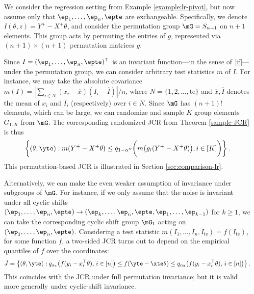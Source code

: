 \documentclass[english]{article}
\begin{document}
\begin{example}\label{lr}
We consider the regression setting from Example \ref{example:lr-pivot}, but
now assume only that $\ep_1,\ldots,\ep_n,\epte$ are exchangeable. 
Specifically, we denote
$I(\theta, z) = Y^+-X^+\theta$, 
and consider the  permutation group 
$\mG = S_{n+1}$ on $n+1$ elements.
This group acts by permuting the entries of $g$, 
represented via $(n+1)\times(n+1)$ permutation 
matrices $g$. 

Since $I = (\ep_1,\ldots,\ep_n,\epte)^\top$ is an invariant function---in the sense of \eqref{if}---under the permutation group, 
we can consider arbitrary test statistics $m$ of $I$.
For instance, we may take the absolute covariance $m(I) = \left|\sum_{i \in N} (x_i - \overline{x})(I_i - \overline{I})\right|/n$, where $N=\{1,2,\ldots,\mathrm{te}\}$ and $\overline{x}, \overline{I}$ denotes the mean of $x_i$ and $I_i$ (respectively) over $i\in N$.
Since $\mG$  has $(n+1)!$ elements, which can be large, we can randomize and sample $K$ group elements $G_{1:K}$ from $\mG$. 
The corresponding randomized JCR from Theorem \ref{sample-JCR} is thus
    $$
    \left\{(\theta,\yte): m(Y^+-X^+\theta) \leq q_{1-\alpha''}\bigg(m\big(g_i(Y^+-X^+\theta)\big),i\in[K]\bigg)\right\}.
    $$
This permutation-based JCR is illustrated in Section \ref{sec:comparison-lr}.

  Alternatively, we can make the even weaker assumption
  of invariance under subgroups of $\mG$. 
  For instance, if we only assume that the noise is invariant under all cyclic shifts
  $(\ep_1, \ldots, \ep_n, \epte) \to (\ep_k, \ldots, \ep_n, \epte, \ep_1, \ldots, \ep_{k-1})$ for $k\ge 1$, 
  we can take the corresponding cyclic shift group $\mG_1$ acting on $(\ep_1,\ldots,\ep_n,\epte)$. 
  Considering a test statistic $m(I_1,\ldots,I_n,I_{\mathrm{te}}) = f(I_{\mathrm{te}})$, for some function $f$,
  a two-sided JCR turns out to depend on the empirical quantiles of $f$ over the coordinates:
    \begin{align}\label{jcyc}
   \tilde{J} = \left\{(\theta,\yte) : q_{\alpha_1}\big(f(y_i - x_i^\top\theta),\, i\in [n] \big) \leq f(\yte - \xte\theta) \leq q_{\alpha_2}\big(f(y_i - x_i^\top\theta),\, i\in [n] \big)\right\}.
\end{align}
This coincides 
with the JCR  under full permutation invariance;
but it is valid more generally under cyclic-shift invariance.
\end{example}
\end{document}
